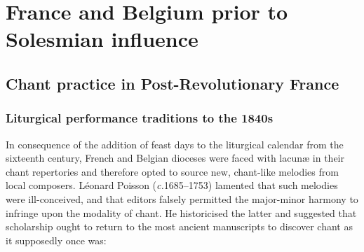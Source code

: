 \chapter{France and Belgium prior to Solesmian influence}
\label{c:2}%
\section{Chant practice in Post-Revolutionary France}
\subsection{Liturgical performance traditions to the 1840s}
In consequence of the addition of feast days to the liturgical calendar from the sixteenth century, French and Belgian dioceses were faced with lacunæ in their chant repertories and therefore opted to source new, chant-like melodies from local composers.
%
Léonard Poisson (\emph{c.}1685--1753) lamented that such melodies were ill-conceived, and that editors falsely permitted the major-minor harmony to infringe upon the modality of chant.
He historicised the latter and suggested that scholarship ought to return to the most ancient manuscripts to discover chant as it supposedly once was:

